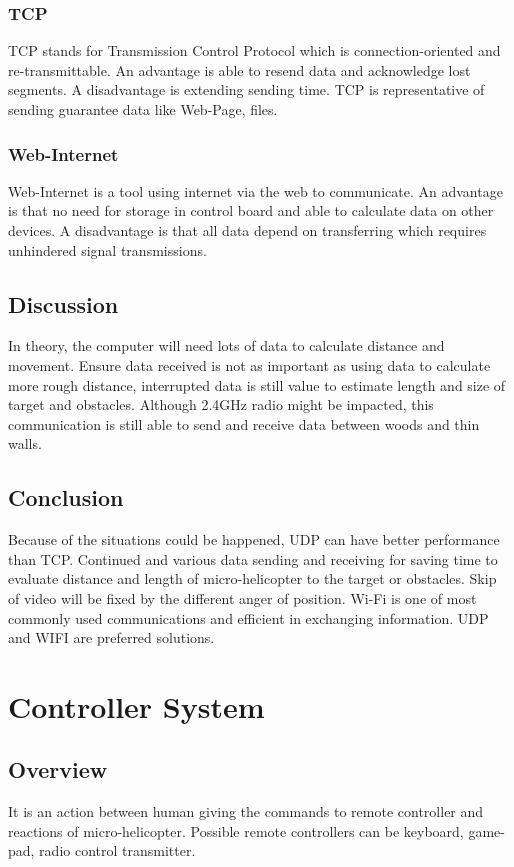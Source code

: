\documentclass[letterpaper, 10, draftclsnofoot, onecolumn, compsoc]{IEEEtran}
\begin{document}
{\subsubsection{TCP}
TCP\cite{r5} stands for Transmission Control Protocol which is connection-oriented and re-transmittable.
An advantage is able to resend data and acknowledge lost segments. A disadvantage is extending sending time.
TCP is representative of sending guarantee data like Web-Page, files.

\subsubsection{Web-Internet}
Web-Internet is a tool using internet via the web to communicate.
An advantage is that no need for storage in control board and able to calculate data on other devices.
A disadvantage is that all data depend on transferring which requires unhindered signal transmissions.


\subsection{Discussion}
In theory, the computer will need lots of data to calculate distance and movement.
Ensure data received is not as important as using data to calculate more rough distance,
interrupted data is still value to estimate length and size of target and obstacles.
Although 2.4GHz radio might be impacted, this communication is still able to send and receive data between woods and thin walls.

\subsection{Conclusion}
Because of the situations could be happened, UDP can have better performance than TCP.
Continued and various data sending and receiving for saving time to evaluate distance and length of micro-helicopter to the target or obstacles.
Skip of video will be fixed by the different anger of position. Wi-Fi is one of most commonly used communications and efficient in exchanging information.
UDP and WIFI are preferred solutions.


\section{Controller System}

\subsection{Overview}
It is an action between human giving the commands to remote controller and reactions of micro-helicopter.
Possible remote controllers can be keyboard, game-pad, radio control transmitter.

}
\end{document}
